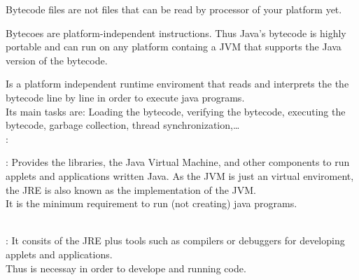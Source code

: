 \begin{notebox}[Notes]\nospacing
  \begin{itemizenosep}
      \item Bytecode files are not files that can be read by processor of your platform yet.
      \item Bytecoes are platform-independent instructions. Thus Java's bytecode is highly portable and can run on any platform
    containg a JVM that supports the Java version of the bytecode.
  \end{itemizenosep}
\end{notebox}
\begin{defnbox}\nospacing
  \begin{defn}
    Is a platform independent runtime enviroment that reads and interprets the the bytecode  line by line
    in order to execute java programs.\\
    Its main tasks are: Loading the bytecode, verifying the bytecode, executing the bytecode, garbage collection,
    thread synchronization,\ldots\\
    :\hfil {}
  \end{defn}
\end{defnbox}
\begin{defnbox}\nospacing
  \begin{defn}
    :
    Provides the libraries, the Java Virtual Machine, and other components to run applets and applications
    written Java. As the JVM is just an virtual enviroment, the JRE is also known as the implementation of the JVM.\\
    It is the minimum requirement to run (not creating) java programs.
  \end{defn}
\end{defnbox}
\begin{defnbox}\nospacing
  \begin{defn}\leavevmode\\
    :
    It consits of the JRE plus tools such as compilers or debuggers for developing applets and applications.\\
    Thus is necessay in order to develope and running code.
  \end{defn}
\end{defnbox}
\begin{sectionbox}\nospacing
  \begin{figure}[H]	
    \centering{
      \vspace{-1em}
      \def\svgwidth{190pt}
      \resizebox{0.8\linewidth}{!}{}
    }
  \end{figure}
\end{sectionbox}
